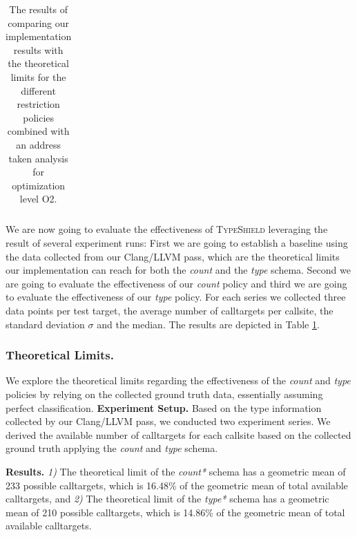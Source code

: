 \begin{table}[htbp!]
\begin{center}
{\begin{tabular}{l|r|rcl|r|rcl|r|rcl|r|rcl|r}
    	\end{tabular}

}
	\caption {The results of comparing our implementation results with the theoretical limits for the different restriction policies combined with an address taken analysis 
	for optimization level O2. 
        }
	\label{tbl:policycompat}
\end{center}
\end{table}

We are now going to evaluate the effectiveness of \textsc{TypeShield} leveraging the result of several experiment runs: First we are going to establish a baseline using the data 
collected from our Clang/LLVM pass, which are the theoretical limits our implementation can reach for both the \textit{count} and the \textit{type} schema. Second we are going to evaluate the effectiveness of our \textit{count} 
policy and third we are going to evaluate the effectiveness of our \textit{type} policy. For each series we collected three data points per test target, the average number of calltargets per callsite, the standard deviation $\sigma$ and the median. 
The results are depicted in Table \ref{tbl:policycompat}. 

\subsubsection{Theoretical Limits.}
\label{subsection:theoreticallimit}
We explore the theoretical limits regarding the effectiveness of the \textit{count} and \textit{type} policies by relying on the collected ground truth data, essentially assuming perfect classification.
\textbf{Experiment Setup.} Based on the type information collected by our Clang/LLVM pass, we conducted two experiment series.
We derived the available number of calltargets for each callsite based on the collected ground truth applying the \textit{count} and \textit{type} schema.

\textbf{Results.}
\textit{1)} The theoretical limit of the \textit{count*} schema has a geometric mean of 233 possible calltargets, which is 16.48\% of the geometric mean of total available 
calltargets, and
\textit{2)} The theoretical limit of the \textit{type*} schema has a geometric mean of 210 possible calltargets, which is 14.86\% of the geometric mean of total available
calltargets.

